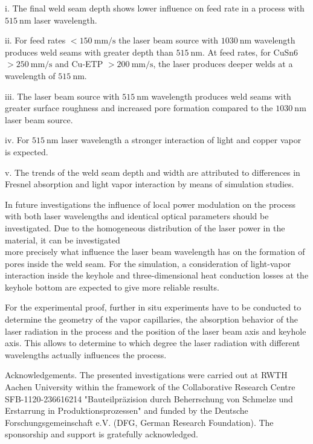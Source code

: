 \documentclass[10pt]{article}
\begin{document}
i. The final weld seam depth shows lower influence on feed rate in a process with $515 \mathrm{~nm}$ laser wavelength.

ii. For feed rates $<150 \mathrm{~mm} / \mathrm{s}$ the laser beam source with $1030 \mathrm{~nm}$ wavelength produces weld seams with greater depth than $515 \mathrm{~nm}$. At feed rates, for CuSn6 $>250 \mathrm{~mm} / \mathrm{s}$ and Cu-ETP $>200 \mathrm{~mm} / \mathrm{s}$, the laser produces deeper welds at a wavelength of $515 \mathrm{~nm}$.

iii. The laser beam source with $515 \mathrm{~nm}$ wavelength produces weld seams with greater surface roughness and increased pore formation compared to the $1030 \mathrm{~nm}$ laser beam source.

iv. For $515 \mathrm{~nm}$ laser wavelength a stronger interaction of light and copper vapor is expected.

v. The trends of the weld seam depth and width are attributed to differences in Fresnel absorption and light vapor interaction by means of simulation studies.

In future investigations the influence of local power modulation on the process with both laser wavelengths and identical optical parameters should be investigated. Due to the homogeneous distribution of the laser power in the material, it can be investigated\\
more precisely what influence the laser beam wavelength has on the formation of pores inside the weld seam. For the simulation, a consideration of light-vapor interaction inside the keyhole and three-dimensional heat conduction losses at the keyhole bottom are expected to give more reliable results.

For the experimental proof, further in situ experiments have to be conducted to determine the geometry of the vapor capillaries, the absorption behavior of the laser radiation in the process and the position of the laser beam axis and keyhole axis. This allows to determine to which degree the laser radiation with different wavelengths actually influences the process.

Acknowledgements. The presented investigations were carried out at RWTH Aachen University within the framework of the Collaborative Research Centre SFB-1120-236616214 "Bauteilpräzision durch Beherrschung von Schmelze und Erstarrung in Produktionsprozessen" and funded by the Deutsche Forschungsgemeinschaft e.V. (DFG, German Research Foundation). The sponsorship and support is gratefully acknowledged.
\end{document}
